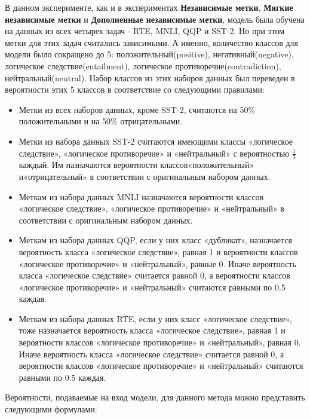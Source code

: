 В данном эксперименте, как и в экспериментах \textbf{Независимые метки}, \textbf{Мягкие независимые метки} и \textbf{Дополненные независимые метки}, модель была обучена на данных из всех четырех задач - RTE, MNLI, QQP и SST-2. Но при этом метки для этих задач считались зависимыми. А именно, количество классов для модели было сокращено до 5: положительный(positive), негативный(negative), логическое следствие(entailment), логическое противоречие(contradiction), нейтральный(neutral). Набор классов из этих наборов данных был переведен в вероятности этих 5 классов в соответствие со следующими правилами:
\begin{itemize}
\item Метки из всех наборов данных, кроме SST-2, считаются на 50\% положительными и на 50\% отрицательными.
\item Метки из набора данных SST-2 считаются имеющими классы «логическое следствие», «логическое противоречие» и «нейтральный» с вероятностью $\frac{1}{3}$ каждый. Им назначаются вероятности классов«положительный» и«отрицательный» в соответствии с оригинальным набором данных.
\item Меткам из набора данных MNLI назначаются вероятности классов «логическое следствие», «логическое противоречие» и «нейтральный» в соответствии с оригинальным набором данных.
\item Меткам из набора данных QQP, если у них класс «дубликат», назначается вероятность класса «логическое следствие», равная 1 и вероятности классов «логическое противоречие» и «нейтральный», равные 0. Иначе вероятность класса «логическое следствие» считается равной 0, а вероятности классов «логическое противоречие» и «нейтральный» считаются равными по 0.5 каждая.
\item Меткам из набора данных RTE, если у них класс «логическое следствие», тоже назначается вероятность класса «логическое следствие», равная 1 и вероятности классов «логическое противоречие» и «нейтральный», равная 0. Иначе вероятность класса «логическое следствие» считается равной 0, а вероятности классов «логическое противоречие» и «нейтральный» считаются равными по 0.5 каждая.
\end{itemize}

Вероятности, подаваемые на вход модели, для данного метода можно представить следующими формулами:

